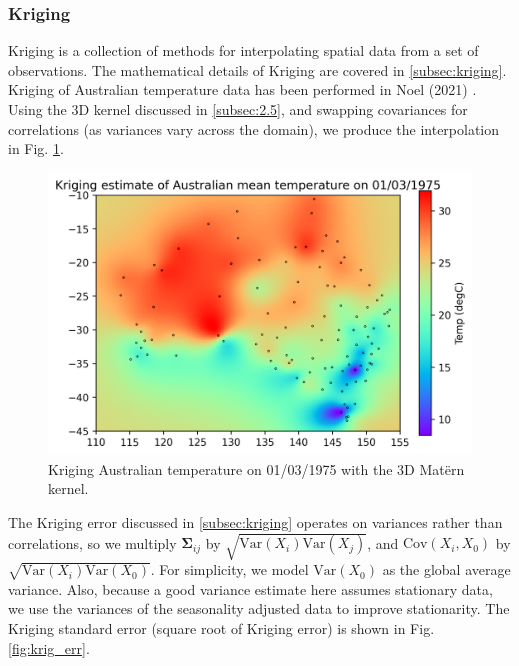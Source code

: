 \documentclass[12pt,a4paper]{article} %
\begin{document}
\subsubsection{Kriging}
\label{subsec:kriging_implementation}
Kriging is a collection of methods for interpolating spatial data from a set of observations. The mathematical details of Kriging are covered in \ref{subsec:kriging}. Kriging of Australian temperature data has been performed in Noel (2021) \cite{cressie}. Using the 3D kernel discussed in \ref{subsec:2.5}, and swapping covariances for correlations (as variances vary across the domain), we produce the interpolation in Fig. \ref{fig:krig}.\\

\begin{figure}[!ht]
    \centering
    \includegraphics[width=.8\linewidth]{mean_temp_model_krig.png}
    \caption{Kriging Australian temperature on 01/03/1975 with the 3D Mat\"{e}rn kernel.}
    \label{fig:krig}
\end{figure}

The Kriging error discussed in \ref{subsec:kriging} operates on variances rather than correlations, so we multiply $\pmb{\Sigma}_{ij}$ by $\sqrt{\text{Var}(X_i)\text{Var}(X_j)}$, and $\text{Cov}(X_i, X_0)$ by $\sqrt{\text{Var}(X_i)\text{Var}(X_0)}$. For simplicity, we model $\text{Var}(X_0)$ as the global average variance. Also, because a good variance estimate here assumes stationary data, we use the variances of the seasonality adjusted data to improve stationarity. The Kriging standard error (square root of Kriging error) is shown in Fig. \ref{fig:krig_err}.\\
\end{document}
